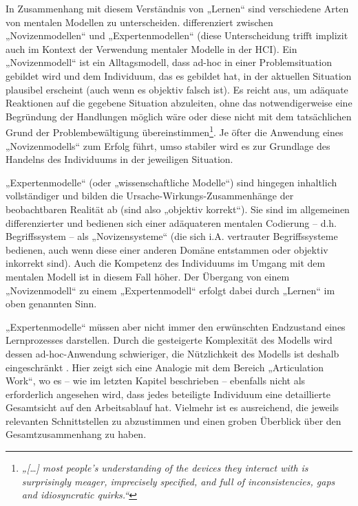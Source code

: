 In Zusammenhang mit diesem Verständnis von „Lernen“ sind verschiedene Arten von mentalen Modellen zu unterscheiden. \citet{Seel91} differenziert zwischen „Novizenmodellen“ und „Expertenmodellen“ (diese Unterscheidung trifft implizit auch \citet{Norman83a} im Kontext der Verwendung mentaler Modelle in der \gls{HCI}). Ein „Novizenmodell“ ist ein Alltagsmodell, dass ad-hoc in einer Problemsituation gebildet wird und dem Individuum, das es gebildet hat, in der aktuellen Situation plausibel erscheint (auch wenn es objektiv falsch ist). Es reicht aus, um adäquate Reaktionen auf die gegebene Situation abzuleiten, ohne das notwendigerweise eine Begründung der Handlungen möglich wäre oder diese nicht mit dem tatsächlichen Grund der Problembewältigung übereinstimmen\footnote{\emph{„[\ldots] most people’s understanding of the devices they interact with is surprisingly meager, imprecisely specified, and full of inconsistencies, gaps and idiosyncratic quirks.“}\citep[][S. 8]{Norman83a}}. Je öfter die Anwendung eines „Novizenmodells“ zum Erfolg führt, umso stabiler wird es zur Grundlage des Handelns des Individuums in der jeweiligen Situation. 

„Expertenmodelle“ (oder „wissenschaftliche Modelle“) sind hingegen inhaltlich vollständiger und bilden die Ursache-Wirkungs-Zusammenhänge der beobachtbaren Realität ab (sind also „objektiv korrekt“). Sie sind im allgemeinen differenzierter und bedienen sich einer adäquateren mentalen Codierung -- d.h. Begriffssystem -- als „Novizensysteme“ (die sich i.A. vertrauter Begriffssysteme bedienen, auch wenn diese einer anderen Domäne entstammen oder objektiv inkorrekt sind). Auch die Kompetenz des Individuums im Umgang mit dem mentalen Modell ist in diesem Fall höher. Der Übergang von einem „Novizenmodell“ zu einem „Expertenmodell“ erfolgt dabei durch „Lernen“ im oben genannten Sinn. \citep{Ifenthaler06}

„Expertenmodelle“ müssen aber nicht immer den erwünschten Endzustand eines Lernprozesses darstellen. Durch die gesteigerte Komplexität des Modells wird dessen ad-hoc-Anwendung schwieriger, die Nützlichkeit des Modells ist deshalb eingeschränkt \citep[vgl. ][S. 20]{Ifenthaler06}. Hier zeigt sich eine Analogie mit dem Bereich „Articulation Work“, wo es -- wie im letzten Kapitel beschrieben -- ebenfalls nicht als erforderlich angesehen wird, dass jedes beteiligte Individuum eine detaillierte Gesamtsicht auf den Arbeitsablauf hat. Vielmehr ist es ausreichend, die jeweils relevanten Schnittstellen zu abzustimmen und einen groben Überblick über den Gesamtzusammenhang zu haben. 

